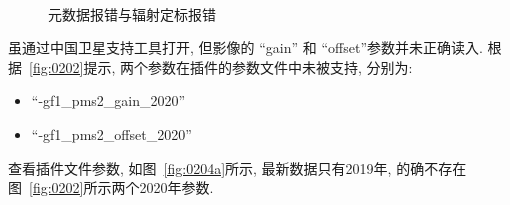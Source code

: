 \begin{figure}[!htbp]
    \centering
    \qquad
    \\[12pt]
    \caption{元数据报错与辐射定标报错}
    \label{fig:0203}
\end{figure}

虽通过中国卫星支持工具打开, 但影像的 ``gain'' 和 ``offset''参数并未正确读入. 根据~\ref{fig:0202}提示, 两个参数在插件的参数文件中未被支持, 分别为:
\begin{itemize}
    \item ``-gf1\_pms2\_gain\_2020''
    \item ``-gf1\_pms2\_offset\_2020''
\end{itemize}

查看插件文件参数, 如图~\ref{fig:0204a}所示, 最新数据只有2019年, 的确不存在图~\ref{fig:0202}所示两个2020年参数.

